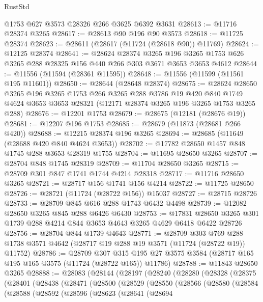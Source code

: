 \begin{lexlean}{RustStd}
\begin{coremodule}
    @1753
    @627
    @3573
    @28326
    @266
    @3625
    @6392
    @3631
@28613 := @11716 @28374 @3265
@28617 := @28613 @90 @196 @90 @3573
@28618 := @11725 @28374
@28623 := @28611 (@28617 (@11724 (@28618 @90)) @11769)
@28624 := @12125 @28374
@28641 := @28624
    @28374
    @3265
    @196
    @3265
    @1753
    @626
    @3265
    @288
    @28325
    @156
    @440
    @266
    @303
    @3671
    @3653
    @3653
    @4612
@28644 := @11556 (@11594 (@28361 @11595))
@28648 := @11556 (@11599 (@11561 @195 @11601))
@28650 := @28644 (@28648 @28374)
@28675 := @28624
    @28650
    @3265
    @196
    @3265
    @1753
    @266
    @3265
    @288
    @3786
    @19
    @420
    @840
    @1749
    @4624
    @3653
    @3653
    @28321
    (@12171 @28374 @3265 @196 @3265 @1753 @3265 @288)
@28676 := @12201 @1753
@28679 := @28675 (@12181 (@28676 @19))
@28681 := @12207 @196 @1753
@28685 := @28679 (@11873 (@28681 @266 @420))
@28688 := @12215 @28374 @196 @3265
@28694 := @28685 (@11649 (@28688 @420 @840 @4624 @3653))
@28702 := @17782 @28650 @1457 @848 @1745 @288 @3653 @28319 @1755
@28704 := @11695 @28650 @3265
@28707 := @28704 @848 @1745 @28319
@28709 := @11704 @28650 @3265
@28715 := @28709 @301 @847 @1741 @1744 @4214 @28318
@28717 := @11716 @28650 @3265
@28721 := @28717 @156 @1741 @156 @4214
@28722 := @11725 @28650
@28726 := @28721 (@11724 (@28722 @156)) @15037
@28727 := @28715 @28726
@28733 := @28709 @845 @616 @288 @1743 @6432 @4498
@28739 := @12082 @28650 @3265 @845 @288 @6426 @6430
@28753 := @17831 @28650 @3265 @301 @1739 @288 @4214 @844 @3653 @4643 @3265 @4629 @6418 @6422 @28726
@28756 := @28704 @844 @1739 @4643
@28771 := @28709
    @303
    @769
    @288
    @1738
    @3571
    @4642
    (@28717 @19 @288 @19 @3571 (@11724 (@28722 @19)) @11752)
@28786 := @28709
    @307
    @315
    @195
    @27
    @3575
    @3584
    (@28717 @165 @195 @165 @3575 (@11724 (@28722 @165)) @11786)
@28788 := @11843 @28650 @3265
@28888 := @28083
    (@28144
      (@28197
        (@28240
          (@28280
            (@28328
              (@28375
                (@28401
                  (@28438
                    (@28471
                      (@28500
                        (@28529
                          (@28550
                            (@28566
                              (@28580
                                (@28584
                                  (@28588
                                    (@28592
                                      (@28596
                                        (@28623
                                          (@28641
                                            (@28694

\end{coremodule}
\end{lexlean}
